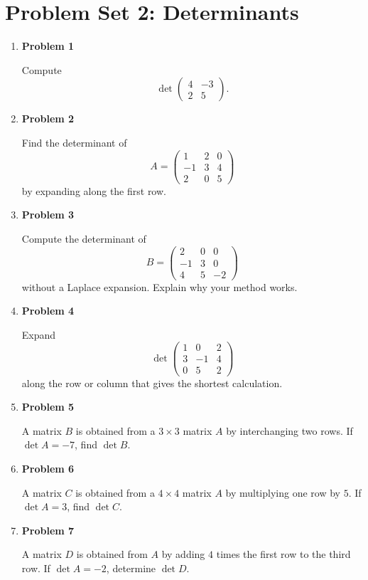 \section{Problem Set 2: Determinants}

\begin{enumerate}
\item \textbf{Problem 1}\par
Compute
\[
\det\begin{pmatrix}4&-3\\2&5\end{pmatrix}.
\]

\item \textbf{Problem 2}\par
Find the determinant of
\[
A=\begin{pmatrix}
1&2&0\\
-1&3&4\\
2&0&5
\end{pmatrix}
\]
by expanding along the first row.

\item \textbf{Problem 3}\par
Compute the determinant of
\[
B=\begin{pmatrix}
2&0&0\\
-1&3&0\\
4&5&-2
\end{pmatrix}
\]
without a Laplace expansion. Explain why your method works.

\item \textbf{Problem 4}\par
Expand
\[
\det\begin{pmatrix}
1&0&2\\
3&-1&4\\
0&5&2
\end{pmatrix}
\]
along the row or column that gives the shortest calculation.

\item \textbf{Problem 5}\par
A matrix \(B\) is obtained from a \(3\times3\) matrix \(A\) by interchanging two rows. If \(\det A=-7\), find \(\det B\).

\item \textbf{Problem 6}\par
A matrix \(C\) is obtained from a \(4\times4\) matrix \(A\) by multiplying one row by \(5\). If \(\det A=3\), find \(\det C\).

\item \textbf{Problem 7}\par
A matrix \(D\) is obtained from \(A\) by adding \(4\) times the first row to the third row. If \(\det A=-2\), determine \(\det D\).


\end{enumerate}
